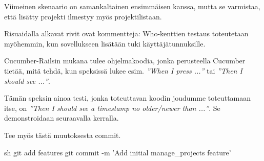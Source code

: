 \documentclass{article}
\newcommand{\en}[1]{\foreignlanguage{english}{#1}}
\begin{document}
Viimeinen skenaario on samankaltainen ensimmäisen kanssa, mutta se varmistaa,
että lisätty projekti ilmestyy myös projektilistaan.

Risuaidalla alkavat rivit ovat kommentteja: \en{Who}-kenttien testaus
toteutetaan myöhemmin, kun sovellukseen lisätään tuki käyttäjätunnuksille.

Cucumber-Railsin mukana tulee ohjelmakoodia, jonka perusteella \en{Cucumber}
tietää, mitä tehdä, kun speksissä lukee esim. {\em ''\en{When I press ...}''}
tai {\em ''\en{Then I should see ...}''}.

Tämän speksin ainoa testi, jonka toteuttavan koodin joudumme toteuttamaan itse,
on {\em ''\en{Then I should see a timestamp no older/newer than ...}''}. Se
demonstroidaan seuraavalla kerralla.

\begin{samepage}
Tee myös tästä muutoksesta commit.

\begin{pygmented}{sh}
git add features
git commit -m 'Add initial manage_projects feature'
\end{pygmented}
\end{samepage}
\end{document}
